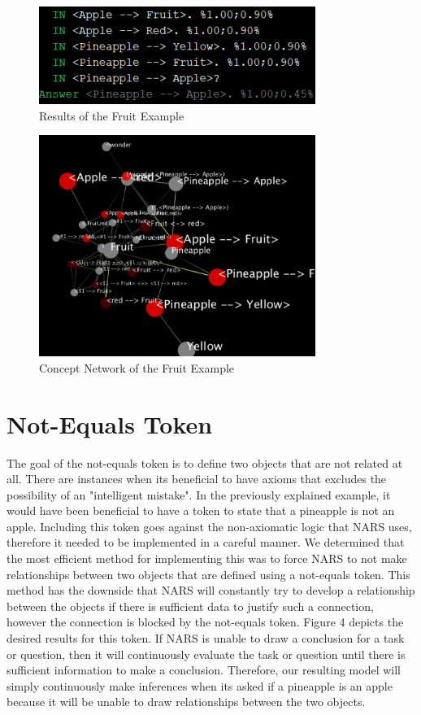 \documentclass[conference]{IEEEtran}
\begin{document}
\begin{figure}[ht!]
\centering
\includegraphics[width=90mm]{Incorrect.png}
\caption{Results of the Fruit Example \label{overflow}}
\end{figure}

\begin{figure}[ht!]
\centering
\includegraphics[width=90mm]{Memory.png}
\caption{Concept Network of the Fruit Example \label{overflow}}
\end{figure}


\section{Not-Equals Token}
	The goal of the not-equals token is to define two objects that are not related at all. There are instances when its beneficial to have axioms that excludes the possibility of an "intelligent mistake". In the previously explained example, it would have been beneficial to have a token to state that a pineapple is not an apple. Including this token goes against the non-axiomatic logic that NARS uses, therefore it needed to be implemented in a careful manner. We determined that the most efficient method for implementing this was to force NARS to not make relationships between two objects that are defined using a not-equals token. This method has the downside that NARS will constantly try to develop a relationship between the objects if there is sufficient data to justify such a connection, however the connection is blocked by the not-equals token. Figure 4 depicts the desired results for this token. If NARS is unable to draw a conclusion for a task or question, then it will continuously evaluate the task or question until there is sufficient information to make a conclusion. Therefore, our resulting model will simply continuously make inferences when its asked if a pineapple is an apple because it will be unable to draw relationships between the two objects.  	
	
\end{document}
